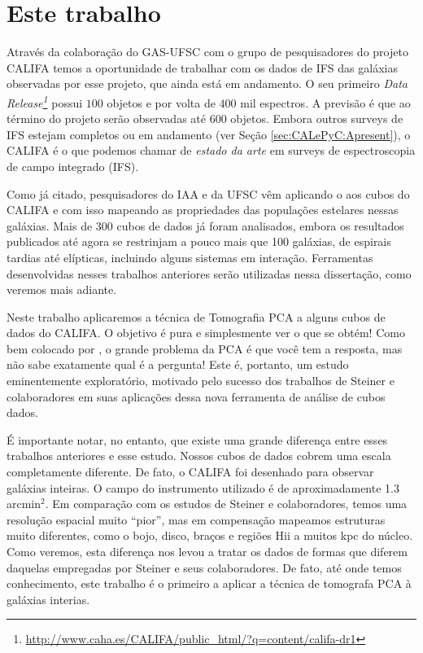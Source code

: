 \section{Este trabalho}
\label{sec:Intro:ThisWork}

Através da colaboração do GAS-UFSC com o grupo de pesquisadores do projeto CALIFA temos a oportunidade de trabalhar com
os dados de IFS das galáxias observadas por esse projeto, que ainda está em andamento. O seu primeiro {\em Data
Release\footnote{\url{http://www.caha.es/CALIFA/public_html/?q=content/califa-dr1}}} \citep[][DR1]{Husemann2013} possui
$100$ objetos e por volta de $400$ mil espectros. A previsão é que ao término do projeto serão observadas até $600$
objetos. Embora outros surveys de IFS estejam completos ou em andamento (ver Seção \ref{sec:CALePyC:Apresent}), o CALIFA
é o que podemos chamar de {\em estado da arte} em surveys de espectroscopia de campo integrado (IFS).

Como já citado, pesquisadores do IAA e da UFSC vêm aplicando o \starlight aos cubos do CALIFA e com isso mapeando as
propriedades das populações estelares nessas galáxias. Mais de 300 cubos de dados já foram analisados, embora os
resultados publicados até agora se restrinjam a pouco mais que 100 galáxias, de espirais tardias até elípticas,
incluindo alguns sistemas em interação. Ferramentas desenvolvidas nesses trabalhos anteriores serão utilizadas nessa
dissertação, como veremos mais adiante.

Neste trabalho aplicaremos a técnica de Tomografia PCA a alguns cubos de dados do CALIFA. O objetivo é pura e
simplesmente ver o que se obtém! Como bem colocado por \citet{Steiner2009}, o grande problema da PCA é que você tem a
resposta, mas não sabe exatamente qual é a pergunta! Este é, portanto, um estudo eminentemente exploratório, motivado
pelo sucesso dos trabalhos de Steiner e colaboradores em suas aplicações dessa nova ferramenta de análise de cubos
dados.

É importante notar, no entanto, que existe uma grande diferença entre esses trabalhos anteriores e esse estudo.  Nossos
cubos de dados cobrem uma escala completamente diferente. De fato, o CALIFA foi desenhado para observar galáxias
inteiras. O campo do instrumento utilizado é de aproximadamente 1.3 arcmin$^2$. Em comparação com os estudos de Steiner
e colaboradores, temos uma resolução espacial muito ``pior'', mas em compensação mapeamos estruturas muito diferentes,
como o bojo, disco, braços e regiões H{\sc ii} a muitos kpc do núcleo. Como veremos, esta diferença nos levou a tratar
os dados de formas que diferem daquelas empregadas por Steiner e seus colaboradores. De fato, até onde temos conhecimento,
este trabalho é o primeiro a aplicar a técnica de tomografa PCA à galáxias interias.

